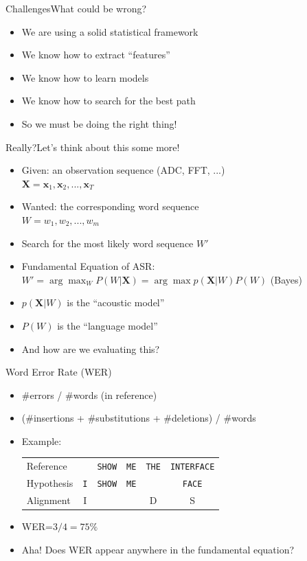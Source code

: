 \begin{frame}{Challenges}{What could be wrong?}
  \begin{itemize}
  \item We are using a solid statistical framework
  \item We know how to extract ``features''
  \item We know how to learn models
  \item We know how to search for the best path
  \item So we must be doing the right thing!
  \end{itemize}
\end{frame}

\begin{frame}{Really?}{Let's think about this some more!}
  \begin{itemize}
    \item Given: an observation sequence (ADC, FFT, ...)\\
      $\boldsymbol{X} = \boldsymbol{x}_1, \boldsymbol{x}_2, ..., \boldsymbol{x}_T$
    \item Wanted: the corresponding word sequence\\
      $W = w_1, w_2, ..., w_m$
    \item Search for the most likely word sequence $W'$
    \item Fundamental Equation of ASR: \\
      $W' = \arg \max_W P(W|\boldsymbol{X}) = \arg \max p(\boldsymbol{X}|W) P(W) $ \hspace{1cm} (Bayes)
    \item $p(\boldsymbol{X}|W)$ is the ``acoustic model''
    \item $P(W)$ is the ``language model''
    \item And how are we evaluating this?
  \end{itemize}
\end{frame}

\begin{frame}{Word Error Rate (WER)}
  \begin{itemize}
  \item \#errors / \#words (in reference)
  \item (\#insertions + \#substitutions + \#deletions) / \#words
  \item Example:\vspace{2mm}\\
    \begin{tabular}{lccccc}
      Reference  &            & \texttt{SHOW} & \texttt{ME} & \texttt{THE} & \texttt{INTERFACE} \\
      Hypothesis & \texttt{I} & \texttt{SHOW} & \texttt{ME} &              & \texttt{FACE} \\
      Alignment  & \textsc{I} &               &             & \textsc{D}   & \textsc{S} \\
    \end{tabular}
  \item WER=$3/4=75\%$
  \item Aha! Does WER appear anywhere in the fundamental equation?
  \end{itemize}
\end{frame}

